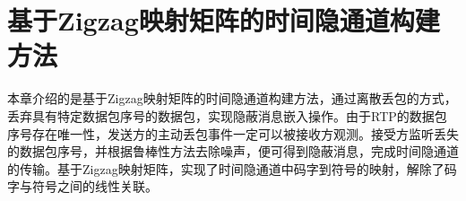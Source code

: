 \chapter{基于Zigzag映射矩阵的时间隐通道构建方法}
\label{chap:zigzag}

本章介绍的是基于Zigzag映射矩阵的时间隐通道构建方法，通过离散丢包的方式，丢弃具有特定数据包序号的数据包，实现隐蔽消息嵌入操作。由于RTP的数据包序号存在唯一性，发送方的主动丢包事件一定可以被接收方观测。接受方监听丢失的数据包序号，并根据鲁棒性方法去除噪声，便可得到隐蔽消息，完成时间隐通道的传输。基于Zigzag映射矩阵，实现了时间隐通道中码字到符号的映射，解除了码字与符号之间的线性关联。





